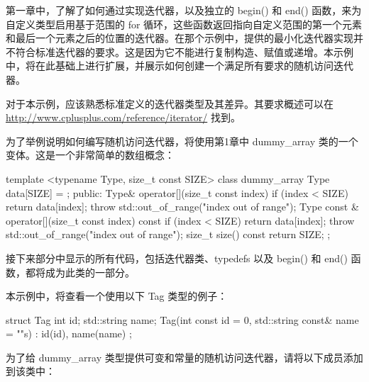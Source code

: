 第一章中，了解了如何通过实现迭代器，以及独立的 begin() 和 end() 函数，来为自定义类型启用基于范围的 for 循环，这些函数返回指向自定义范围的第一个元素和最后一个元素之后的位置的迭代器。在那个示例中，提供的最小化迭代器实现并不符合标准迭代器的要求。这是因为它不能进行复制构造、赋值或递增。本示例中，将在此基础上进行扩展，并展示如何创建一个满足所有要求的随机访问迭代器。


对于本示例，应该熟悉标准定义的迭代器类型及其差异。其要求概述可以在 \url{http://www.cplusplus.com/reference/iterator/} 找到。

为了举例说明如何编写随机访问迭代器，将使用第1章中 dummy\_array 类的一个变体。这是一个非常简单的数组概念：

\begin{cpp}
template <typename Type, size_t const SIZE>
class dummy_array
{
    Type data[SIZE] = {};
    public:
    Type& operator[](size_t const index)
    {
        if (index < SIZE) return data[index];
        throw std::out_of_range("index out of range");
    }
    Type const & operator[](size_t const index) const
    {
        if (index < SIZE) return data[index];
        throw std::out_of_range("index out of range");
    }
    size_t size() const { return SIZE; }
};
\end{cpp}

接下来部分中显示的所有代码，包括迭代器类、typedefs 以及 begin() 和 end() 函数，都将成为此类的一部分。

本示例中，将查看一个使用以下 Tag 类型的例子：

\begin{cpp}
struct Tag
{
    int id;
    std::string name;
    Tag(int const id = 0, std::string const& name = ""s) :
        id(id), name(name)
    {}
};
\end{cpp}


为了给 dummy\_array 类型提供可变和常量的随机访问迭代器，请将以下成员添加到该类中：

